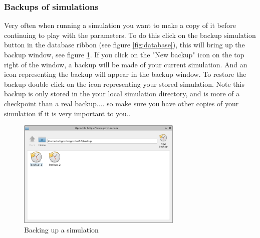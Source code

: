 \subsubsection{Backups of simulations}
Very often when running a simulation you want to make a copy of it before continuing to play with the parameters.  To do this click on the backup simulation button in the database ribbon (see figure \ref{fig:database}), this will bring up the backup window, see figure \ref{fig:backup}. If you click on the "New backup" icon on the top right of the window, a backup will be made of your current simulation.  And an icon representing the backup will appear in the backup window.  To restore the backup double click on the icon representing your stored simulation. Note this backup is only stored in the your local simulation directory, and is more of a checkpoint than a real backup.... so make sure you have other copies of your simulation if it is very important to you..

\begin{figure}[H]
\centering
\includegraphics[width=0.7\textwidth]{./images/backup.png}
\caption{Backing up a simulation}
\label{fig:backup}
\end{figure}

